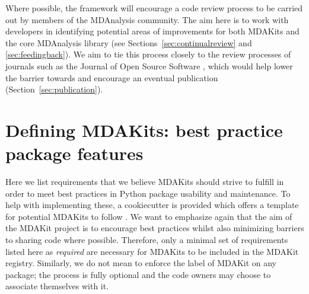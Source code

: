\documentclass[9pt,whitepaper]{livecoms}
\begin{document}
Where possible, the framework will encourage a code review process to be carried out by members of the MDAnalysis community. The aim here is to work with developers in identifying potential areas of improvements for both MDAKits and the core MDAnalysis library (see Sections~\ref{sec:continualreview} and \ref{sec:feedingback}). We aim to tie this process closely to the review processes of journals such as the Journal of Open Source Software \cite{noauthor_journal_nodate}, which would help lower the barrier towards and encourage an eventual publication (Section~\ref{sec:publication}).

\section{Defining MDAKits: best practice package features}
\label{sec:definitions}

Here we list requirements that we believe MDAKits should strive to fulfill in order to meet best practices in Python package usability and maintenance. To help with implementing these, a cookiecutter is provided which offers a template for potential MDAKits to follow \cite{wang_cookiecutter_nodate}. We want to emphasize again that the aim of the MDAKit project is to encourage best practices whilst also minimizing barriers to sharing code where possible. Therefore, only a minimal set of requirements listed here as \emph{required} are necessary for MDAKits to be included in the MDAKit registry. Similarly, we do not mean to enforce the label of MDAKit on any package; the process is fully optional and the code owners may choose to associate themselves with it.
\end{document}
